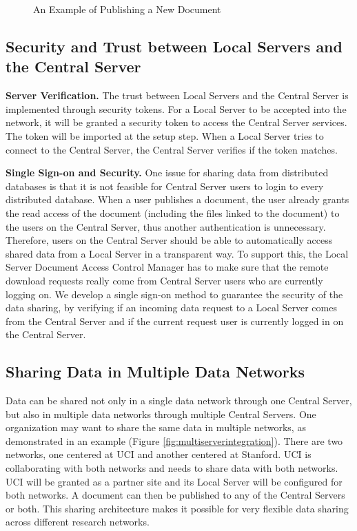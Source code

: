 \documentclass{singlecol-new}
\theoremstyle{TH}{
\newtheorem{lemma}{Lemma}
\newtheorem{theorem}[lemma]{Theorem}
\newtheorem{corrolary}[lemma]{Corrolary}
\newtheorem{conjecture}[lemma]{Conjecture}
\newtheorem{proposition}[lemma]{Proposition}
\newtheorem{claim}[lemma]{Claim}
\newtheorem{stheorem}[lemma]{Wrong Theorem}
\newtheorem{algorithm}{Algorithm}
}
\theoremstyle{THrm}{
\newtheorem{definition}{Definition}[section]
\newtheorem{question}{Question}[section]
\newtheorem{remark}{Remark}
\newtheorem{scheme}{Scheme}
}
\theoremstyle{THhit}{
\newtheorem{case}{Case}[section]
}
\begin{document}
\begin{figure*}[t]%
\caption{An Example of Publishing a New Document}
\label{fig:editpublish}
\end{figure*}

\subsection{Security and Trust between Local Servers and the Central Server}

\textbf{Server Verification.} The trust between Local Servers and
the Central Server is implemented through security tokens. For a
Local Server to be accepted into the network, it will be granted a
security token to access the Central Server services. The token will
be imported at the setup step. When a Local Server tries to connect
to the Central Server, the Central Server verifies if the token
matches.


\textbf{Single Sign-on and Security.} One issue for sharing data
from distributed databases is that it is not feasible for Central
Server users to login to every distributed database. When a user
publishes a document, the user already grants the read access of the
document (including the files linked to the document) to the users
on the Central Server, thus another authentication is unnecessary.
Therefore, users on the Central Server should be able to
automatically access shared data from a Local Server in a
transparent way. To support this, the Local Server Document Access
Control Manager has to make sure that the remote download requests
really come from Central Server users who are currently logging on.
We develop a single sign-on method to guarantee the security of the
data sharing, by verifying if an incoming data request to a Local
Server comes from the Central Server and if the current request user
is currently logged in on the Central Server.



\subsection{Sharing Data in Multiple Data Networks}

Data can  be shared not only in a single data network through one
Central Server, but also in multiple data networks through multiple
Central Servers. One organization may want to share the same data in
multiple networks, as demonstrated in an example (Figure
\ref{fig:multiserverintegration}).  There are two networks,  one
centered at UCI and another centered at Stanford. UCI is
collaborating with both networks and needs to share data with both
networks.  UCI will be granted as a partner site and its Local
Server will be configured for both networks. A document can then be
published to any of the Central Servers or both.  This sharing
architecture makes it possible for very flexible data sharing across
different research networks.
\end{document}
